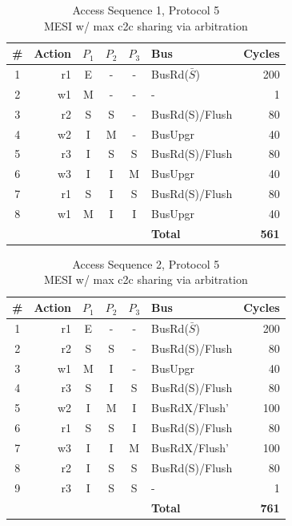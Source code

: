 \documentclass[12pt, letterpaper]{report}
\begin{document}
\begin{table}[H]
	\setlength{\extrarowheight}{.5ex}
	\centering
	\begin{tabular}{ |c|r|c|c|c|l|r| }
		\hline
		\textbf{\#} & \textbf{Action} & \textbf{$P_1$} & \textbf{$P_{2}$} & \textbf{$P_3$} & \textbf{Bus} & \textbf{Cycles} \\
		\hline
		1 & r1 & E & - & - & BusRd($\bar{S}$) & 200 \\
		\hline
		2 & w1 & M & - & - & - & 1 \\
		\hline
		3 & r2 & S & S & - & BusRd(S)/Flush & 80 \\
		\hline
		4 & w2 & I & M & - & BusUpgr & 40 \\
		\hline
		5 & r3 & I & S & S & BusRd(S)/Flush & 80 \\
		\hline
		6 & w3 & I & I & M & BusUpgr & 40 \\
		\hline
		7 & r1 & S & I & S & BusRd(S)/Flush & 80 \\
		\hline
		8 & w1 & M & I & I & BusUpgr & 40 \\
		\hline \hline \hline
		\cellcolor{null} & \cellcolor{null} & \cellcolor{null} & \cellcolor{null} & \cellcolor{null} & \textbf{Total} & \textbf{561} \\
		\hline
	\end{tabular}
	\caption{Access Sequence 1, Protocol 5\\MESI w/ max c2c sharing via arbitration}
\end{table}


\begin{table}[H]
	\setlength{\extrarowheight}{.5ex}
	\centering
	\begin{tabular}{ |c|r|c|c|c|l|r| }
		\hline
		\textbf{\#} & \textbf{Action} & \textbf{$P_1$} & \textbf{$P_{2}$} & \textbf{$P_3$} & \textbf{Bus} & \textbf{Cycles} \\
		\hline
		1 & r1 & E & - & - & BusRd($\bar{S}$) & 200 \\
		\hline
		2 & r2 & S & S & - & BusRd(S)/Flush & 80 \\
		\hline
		3 & w1 & M & I & - & BusUpgr & 40 \\
		\hline
		4 & r3 & S & I & S & BusRd(S)/Flush & 80 \\
		\hline
		5 & w2 & I & M & I & BusRdX/Flush' & 100 \\
		\hline
		6 & r1 & S & S & I & BusRd(S)/Flush & 80 \\
		\hline
		7 & w3 & I & I & M & BusRdX/Flush' & 100 \\
		\hline
		8 & r2 & I & S & S & BusRd(S)/Flush & 80 \\
		\hline
		9 & r3 & I & S & S & - & 1 \\
		\hline \hline \hline
		\cellcolor{null} & \cellcolor{null} & \cellcolor{null} & \cellcolor{null} & \cellcolor{null} & \textbf{Total} & \textbf{761} \\
		\hline
	\end{tabular}
	\caption{Access Sequence 2, Protocol 5\\MESI w/ max c2c sharing via arbitration}
\end{table}
\end{document}
